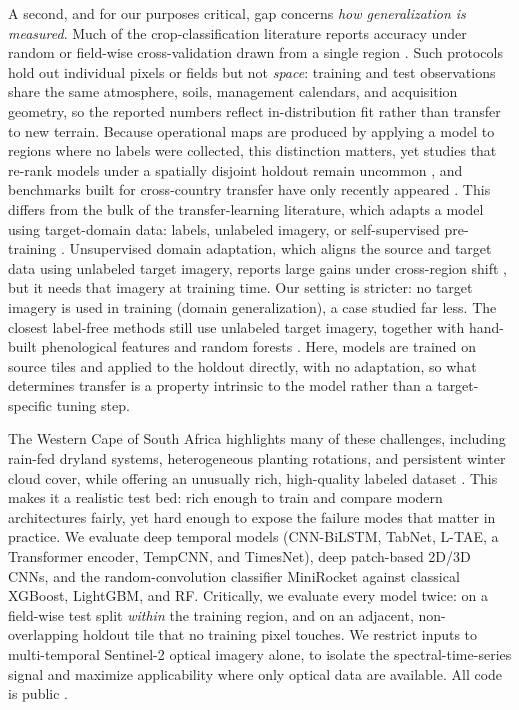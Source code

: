 \documentclass[preprint,authoryear]{elsarticle}
\begin{document}
A second, and for our purposes critical, gap concerns \emph{how generalization is measured}. Much of the crop-classification literature reports accuracy under random or field-wise cross-validation drawn from a single region \citep{belgiu2016, ltae2020, tempcnn2019, russwurm2018, ieee2017}. Such protocols hold out individual pixels or fields but not \emph{space}: training and test observations share the same atmosphere, soils, management calendars, and acquisition geometry, so the reported numbers reflect in-distribution fit rather than transfer to new terrain. Because operational maps are produced by applying a model to regions where no labels were collected, this distinction matters, yet studies that re-rank models under a spatially disjoint holdout remain uncommon \citep{jin2019, rustowicz2019, hoppe2024, antonio2024}, and benchmarks built for cross-country transfer have only recently appeared \citep{reuss2025eurocropsml}. This differs from the bulk of the transfer-learning literature, which adapts a model using target-domain data: labels, unlabeled imagery, or self-supervised pre-training \citep{ma2024, cropformer2023, mai2025}. Unsupervised domain adaptation, which aligns the source and target data using unlabeled target imagery, reports large gains under cross-region shift \citep{nyborg2022timematch, wang2023uda, mohammadi2024, wang2025climate}, but it needs that imagery at training time. Our setting is stricter: no target imagery is used in training (domain generalization), a case studied far less. The closest label-free methods still use unlabeled target imagery, together with hand-built phenological features and random forests \citep{yang2024wheat, zhang2026transfer}. Here, models are trained on source tiles and applied to the holdout directly, with no adaptation, so what determines transfer is a property intrinsic to the model rather than a target-specific tuning step.

The Western Cape of South Africa highlights many of these challenges, including rain-fed dryland systems, heterogeneous planting rotations, and persistent winter cloud cover, while offering an unusually rich, high-quality labeled dataset \citep{mlhub}. This makes it a realistic test bed: rich enough to train and compare modern architectures fairly, yet hard enough to expose the failure modes that matter in practice. We evaluate deep temporal models (CNN-BiLSTM, TabNet, L-TAE, a Transformer encoder, TempCNN, and TimesNet), deep patch-based 2D/3D CNNs, and the random-convolution classifier MiniRocket against classical XGBoost, LightGBM, and RF. Critically, we evaluate every model twice: on a field-wise test split \emph{within} the training region, and on an adjacent, non-overlapping holdout tile that no training pixel touches. We restrict inputs to multi-temporal Sentinel-2 optical imagery alone, to isolate the spectral-time-series signal and maximize applicability where only optical data are available. All code is public \citep{primary_repo}.
\end{document}

